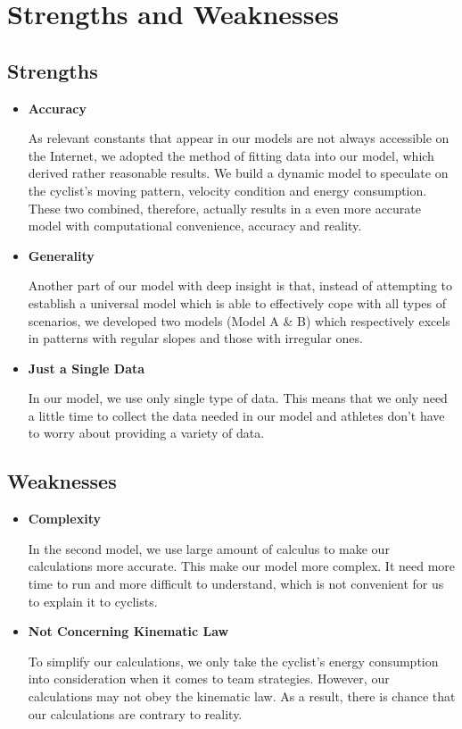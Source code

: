 \documentclass{article}
\begin{document}
	\section{Strengths and Weaknesses}
		\subsection*{Strengths}
			\begin{itemize}
				\item\textbf{Accuracy}

					As relevant constants that appear in our models are not always accessible on the Internet, we adopted the method of fitting data into our model, which derived rather reasonable results. We build a dynamic model to speculate on the cyclist's moving pattern, velocity condition and energy consumption. These two combined, therefore, actually results in a even more accurate model with computational convenience, accuracy and reality.
				\item\textbf{Generality}

					Another part of our model with deep insight is that, instead of attempting to establish a universal model which is able to effectively cope with all types of scenarios, we developed two models (Model A \& B) which respectively excels in patterns with regular slopes and those with irregular ones.
				\item\textbf{Just a Single Data}

					In our model, we use only single type of data. This means that we only need a little time to collect the data needed in our model and athletes don't have to worry about providing a variety of data.
			\end{itemize}
		\subsection*{Weaknesses}

			\begin{itemize}
				\item\textbf{Complexity}

					In the second model, we use large amount of calculus to make our calculations more accurate. This make our model more complex. It need more time to run and more difficult to understand, which is not convenient for us to explain it to cyclists.
				\item\textbf{Not Concerning Kinematic Law}

					To simplify our calculations, we only take the cyclist's energy consumption into consideration when it comes to team strategies. However, our calculations may not obey the kinematic law. As a result, there is chance that our calculations are contrary to reality.

			\end{itemize}
	\newpage
\end{document}
